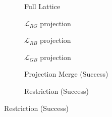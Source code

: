 \documentclass{article}
\begin{document}
\begin{figure}[hbtp]
    \centering
    \begin{subfigure}[b]{0.32\textwidth}
        \centering
        \resizebox{\linewidth}{!}{
            
        }
        \caption{Full Lattice}
    \end{subfigure}
    \hfill
    \begin{subfigure}[b]{0.32\textwidth}
        \centering
        \resizebox{\linewidth}{!}{
            
        }
        \caption{$\mathcal{L}_{RG}$ projection}
    \end{subfigure}
    \hfill
    \begin{subfigure}[b]{0.32\textwidth}
        \centering
        \resizebox{\linewidth}{!}{
            
        }
        \caption{$\mathcal{L}_{RB}$ projection}
    \end{subfigure}

    \vspace{0.5cm}

    \begin{subfigure}[b]{0.32\textwidth}
        \centering
        \resizebox{\linewidth}{!}{
            
        }
        \caption{$\mathcal{L}_{GB}$ projection}
    \end{subfigure}
    \hfill
    \begin{subfigure}[b]{0.32\textwidth}
        \centering
        \resizebox{\linewidth}{!}{
            
        }
        \caption{Projection Merge (Success)}
    \end{subfigure}
    \hfill
    \begin{subfigure}[b]{0.32\textwidth}
        \centering
        \resizebox{\linewidth}{!}{
            
        }
        \caption{Restriction (Success)}
    \end{subfigure}
\end{figure}
\end{document}

